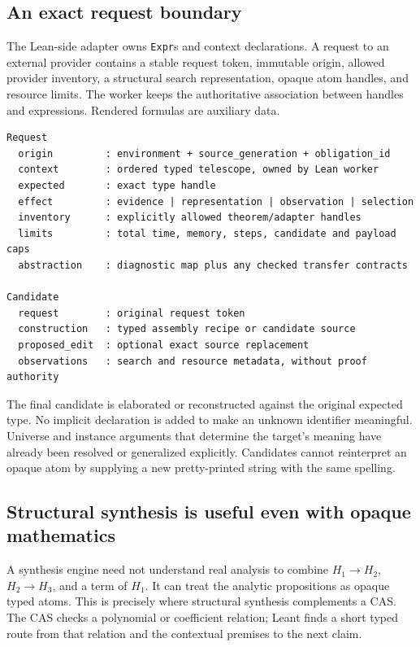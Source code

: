 \documentclass[11pt,a4paper]{article}
\newcommand{\code}[1]{\nolinkurl{#1}}
\theoremstyle{definition}
\begin{document}
\subsection{An exact request boundary}
The Lean-side adapter owns \code{Expr}s and context declarations. A request to an
external provider contains a stable request token, immutable origin, allowed
provider inventory, a structural search representation, opaque atom handles,
and resource limits. The worker keeps the authoritative association between
handles and expressions. Rendered formulas are auxiliary data.

\begin{lstlisting}
Request
  origin         : environment + source_generation + obligation_id
  context        : ordered typed telescope, owned by Lean worker
  expected       : exact type handle
  effect         : evidence | representation | observation | selection
  inventory      : explicitly allowed theorem/adapter handles
  limits         : total time, memory, steps, candidate and payload caps
  abstraction    : diagnostic map plus any checked transfer contracts

Candidate
  request        : original request token
  construction   : typed assembly recipe or candidate source
  proposed_edit  : optional exact source replacement
  observations   : search and resource metadata, without proof authority
\end{lstlisting}

The final candidate is elaborated or reconstructed against the original expected
type. No implicit declaration is added to make an unknown identifier meaningful.
Universe and instance arguments that determine the target's meaning have already
been resolved or generalized explicitly. Candidates cannot reinterpret an opaque
atom by supplying a new pretty-printed string with the same spelling.

\subsection{Structural synthesis is useful even with opaque mathematics}
A synthesis engine need not understand real analysis to combine
\(H_1\to H_2\), \(H_2\to H_3\), and a term of \(H_1\). It can treat the
analytic propositions as opaque typed atoms. This is precisely where structural
synthesis complements a CAS. The CAS checks a polynomial or coefficient relation;
Leant finds a short typed route from that relation and the contextual premises
to the next claim.
\end{document}
